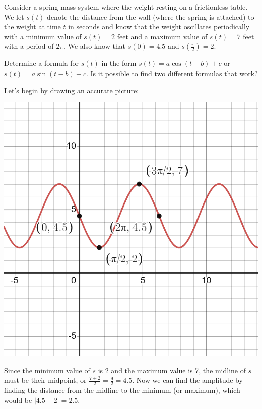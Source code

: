 \documentclass{ximera}
\begin{document}
\begin{example}
Consider a spring-mass system where the weight resting on a frictionless table.  We let \(s(t)\) denote the distance from the wall (where the spring is attached) to the weight at time \(t\) in seconds and know that the weight oscillates periodically with a minimum value of \(s(t) = 2\) feet and a maximum value of \(s(t) = 7\) feet with a period of \(2 \pi\).  We also know that \(s(0) = 4.5\) and \(s\left(\frac{\pi}{2}\right) = 2\).%

Determine a formula for \(s(t)\) in the form \(s(t) = a\cos(t-b)+c\) or \(s(t) = a\sin(t-b)+c\).  Is it possible to find two different formulas that work?  
\begin{explanation}
Let's begin by drawing an accurate picture:
\begin{image}
\includegraphics[width=0.8\linewidth]{images/spring-ex.png}
\end{image}

Since the minimum value of $s$ is 2 and the maximum value is 7, the midline of $s$ must be their midpoint, or $\frac{7+2}{2} = \frac{9}{2} = 4.5$. Now we can find the amplitude by finding the distance from the midline to the minimum (or maximum), which would be $|4.5 - 2| = 2.5$. 


\end{explanation}
\end{example}
\end{document}
